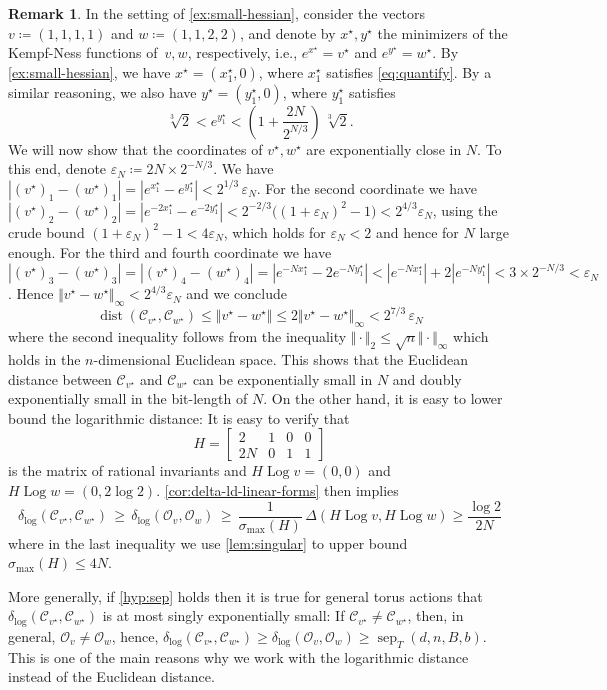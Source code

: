 \documentclass[10pt,a4paper]{article}
\theoremstyle{definition}
\newtheorem{remark}[theorem]{Remark}
\DeclareMathOperator{\sep}{sep}
\DeclareMathOperator{\Log}{Log}
\DeclareMathOperator{\dist}{dist}
\newcommand{\distLD}{\delta_{\log}}
\newcommand{\OO}{\ensuremath{\mathcal{O}}}
\newcommand{\KK}{\ensuremath{\mathcal{C}}}
\numberwithin{equation}{section}
\begin{document}
\begin{remark}
In the setting of \cref{ex:small-hessian}, consider the vectors~$v\coloneqq (1,1,1,1)$ and $w\coloneqq (1,1,2,2)$, and denote by $x^\star,y^\star$ the minimizers of the Kempf-Ness functions of~$v,w$, respectively, i.e., $e^{x^\star}=v^\star$ and $e^{y^\star}=w^\star$.
By \cref{ex:small-hessian}, we have $x^\star=(x^\star_1,0)$, where $x^\star_1$ satisfies \cref{eq:quantify}.
By a similar reasoning, we also have $y^\star=(y^\star_1,0)$, where $y^\star_1$ satisfies
\[
  \sqrt[3]{2} < e^{y^\star_1} < \left( 1 + \frac{2N}{2^{N/3}} \right)\, \sqrt[3]{2}.
\]
We will now show that the coordinates of $v^\star, w^\star$ are exponentially close in $N$.
To this end, denote $\varepsilon_N\coloneqq 2N \times 2^{-N/3}$.
We have $|(v^\star)_1-(w^\star)_1| = |e^{x^\star_1}-e^{y^\star_1}| < 2^{1/3}\,\varepsilon_N $.
For the second coordinate we have $|(v^\star)_2-(w^\star)_2|=|e^{-2x^\star_1}-e^{-2y^\star_1}|<2^{-2/3}\big((1+\varepsilon_N)^2-1\big)< 2^{4/3}\varepsilon_N$, using the crude bound $(1+\varepsilon_N)^2-1<4\varepsilon_N$, which holds for $\varepsilon_N<2$ and hence for $N$ large enough.
For the third and fourth coordinate we have $|(v^\star)_3-(w^\star)_3|=|(v^\star)_4-(w^\star)_4|=|e^{-Nx^\star_1}-2e^{-Ny^\star_1}|<|e^{-Nx^\star_1}|+2|e^{-Ny^\star_1}|<3\times 2^{-N/3}<\varepsilon_N$.
Hence $\Vert v^\star-w^\star\Vert_{\infty}<2^{4/3}\varepsilon_N$ and we conclude
\[
  \dist(\KK_{v^\star},\KK_{w^\star}) \leq \Vert v^\star-w^\star\Vert \leq 2\Vert v^\star-w^\star\Vert_{\infty} < 2^{7/3}\, \varepsilon_N
\]
where the second inequality follows from the inequality $\Vert\cdot\Vert_2\leq \sqrt{n}\Vert\cdot\Vert_\infty$ which holds in the $n$-dimensional Euclidean space.
This shows that the Euclidean distance between $\KK_{v^\star}$ and $\KK_{w^\star}$ can be exponentially small in $N$ and doubly exponentially small in the bit-length of $N$.
On the other hand, it is easy to lower bound the logarithmic distance: It is easy to verify that \[
H=\begin{bmatrix}
    2 & 1 & 0 & 0\\
    2N & 0 & 1 & 1
\end{bmatrix}
\] is the matrix of rational invariants and $H\Log v = (0,0)$ and $H\Log w = (0, 2\log 2)$. \cref{cor:delta-ld-linear-forms} then implies \[
\distLD(\KK_{v^\star},\KK_{w^\star}) \, \geq \, \distLD(\OO_v,\OO_w) \, \geq \, \frac{1}{\sigma_{\max}(H)} \, \Delta(H \Log v, H\Log w) \geq \frac{\log 2}{2N}
\] where in the last inequality we use \cref{lem:singular} to upper bound $\sigma_{\max}(H)\leq 4N$.

More generally, if \cref{hyp:sep} holds then it is true for general torus actions that $\distLD(\KK_{v^\star},\KK_{w^\star})$ is at most singly exponentially small:
If $\KK_{v^\star}\neq\KK_{w^\star}$, then, in general, $\OO_v\neq\OO_w$, hence, $\distLD(\KK_{v^\star},\KK_{w^\star})\geq \distLD(\OO_v,\OO_w)\geq \sep_T(d,n,B,b)$.
This is one of the main reasons why we work with the logarithmic distance instead of the Euclidean distance.
\end{remark}
\end{document}
